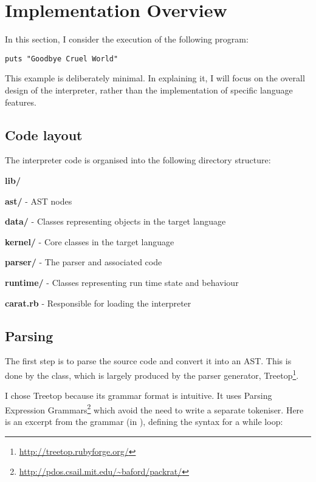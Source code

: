 \section{Implementation Overview}

In this section, I consider the execution of the following program:

\begin{lstlisting}
puts "Goodbye Cruel World"
\end{lstlisting}

This example is deliberately minimal. In explaining it, I will focus on the overall design of the interpreter, rather than the implementation of specific language features.

\subsection{Code layout}

The interpreter code is organised into the following directory structure:

\begin{dirlist}
  \item \textbf{lib/}
    \begin{dirlist}
      \item \textbf{ast/} - AST nodes
      \item \textbf{data/} - Classes representing objects in the target language
      \item \textbf{kernel/} - Core classes in the target language
      \item \textbf{parser/} - The parser and associated code
      \item \textbf{runtime/} - Classes representing run time state and behaviour
      \item \textbf{carat.rb} - Responsible for loading the interpreter
    \end{dirlist}
\end{dirlist}

\subsection{Parsing}

The first step is to parse the source code and convert it into an AST. This is done by the \-\- class, which is largely produced by the parser generator, Treetop\footnote{\url{http://treetop.rubyforge.org/}}.

I chose Treetop because its grammar format is intuitive. It uses Parsing Expression Grammars\footnote{\url{http://pdos.csail.mit.edu/~baford/packrat/}} which avoid the need to write a separate tokeniser. Here is an excerpt from the grammar (in ), defining the syntax for a while loop:

